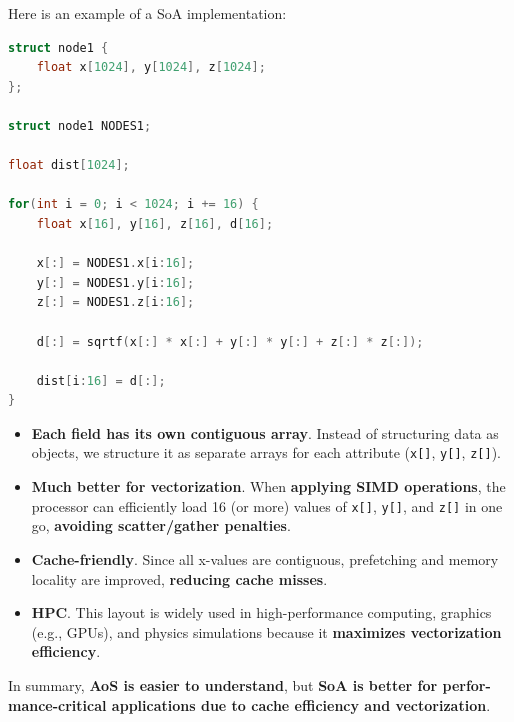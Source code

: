 \begin{examplebox}
    Here is an example of a SoA implementation:
    \begin{lstlisting}[language=c++]
struct node1 {
    float x[1024], y[1024], z[1024];
};

struct node1 NODES1;

float dist[1024];

for(int i = 0; i < 1024; i += 16) {
    float x[16], y[16], z[16], d[16];

    x[:] = NODES1.x[i:16];
    y[:] = NODES1.y[i:16];
    z[:] = NODES1.z[i:16];

    d[:] = sqrtf(x[:] * x[:] + y[:] * y[:] + z[:] * z[:]);

    dist[i:16] = d[:];
}\end{lstlisting}
    \begin{itemize}[label=\textcolor{Green3}{}]
        \item \textcolor{Green3}{\textbf{Each field has its own contiguous array}}. Instead of structuring data as objects, we structure it as separate arrays for each attribute (\texttt{x[]}, \texttt{y[]}, \texttt{z[]}).
        \item \textcolor{Green3}{\textbf{Much better for vectorization}}. When \textbf{applying SIMD operations}, the processor can efficiently load 16 (or more) values of \texttt{x[]}, \texttt{y[]}, and \texttt{z[]} in one go, \textbf{avoiding scatter/gather penalties}.
        \item \textcolor{Green3}{\textbf{Cache-friendly}}. Since all x-values are contiguous, prefetching and memory locality are improved, \textbf{reducing cache misses}.
        \item \textcolor{Green3}{\textbf{HPC}}. This layout is widely used in high-performance computing, graphics (e.g., GPUs), and physics simulations because it \textbf{maximizes vectorization efficiency}.
    \end{itemize}
\end{examplebox}

\noindent
In summary, \textbf{AoS is easier to understand}, but \textbf{SoA is better for perfor-\break mance-critical applications due to cache efficiency and vectorization}. 
